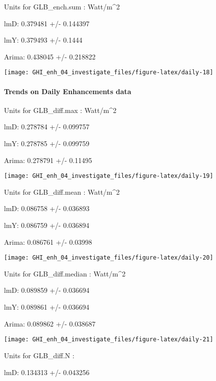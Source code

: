 \documentclass[
  10pt,
  a4paper,oneside]{article}
\begin{document}
Units for GLB\_ench.sum : Watt/m\^{}2

lmD: 0.379481 +/- 0.144397

lmY: 0.379493 +/- 0.1444

Arima: 0.438045 +/- 0.218822

\begin{center}\texttt{[image: GHI\_enh\_04\_investigate\_files/figure-latex/daily-18]} \end{center}

\newpage

\hypertarget{trends-on-daily-enhancements-data}{%
\paragraph{Trends on Daily Enhancements data}\label{trends-on-daily-enhancements-data}}

Units for GLB\_diff.max : Watt/m\^{}2

lmD: 0.278784 +/- 0.099757

lmY: 0.278785 +/- 0.099759

Arima: 0.278791 +/- 0.11495

\begin{center}\texttt{[image: GHI\_enh\_04\_investigate\_files/figure-latex/daily-19]} \end{center}

Units for GLB\_diff.mean : Watt/m\^{}2

lmD: 0.086758 +/- 0.036893

lmY: 0.086759 +/- 0.036894

Arima: 0.086761 +/- 0.03998

\begin{center}\texttt{[image: GHI\_enh\_04\_investigate\_files/figure-latex/daily-20]} \end{center}

Units for GLB\_diff.median : Watt/m\^{}2

lmD: 0.089859 +/- 0.036694

lmY: 0.089861 +/- 0.036694

Arima: 0.089862 +/- 0.038687

\begin{center}\texttt{[image: GHI\_enh\_04\_investigate\_files/figure-latex/daily-21]} \end{center}

Units for GLB\_diff.N :

lmD: 0.134313 +/- 0.043256
\end{document}
